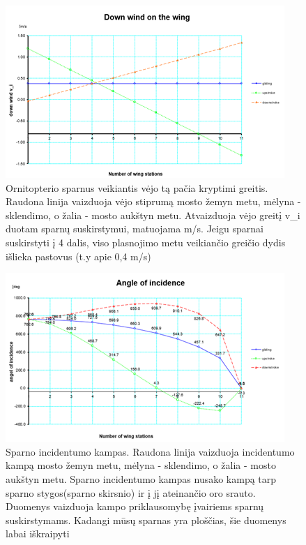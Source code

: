 \documentclass{VUMIFPSkursinis}
\begin{document}
\begin{figure}[h]
	\caption{Ornitopterio sparnus veikiantis vėjo tą pačia kryptimi greitis. Raudona linija vaizduoja vėjo stiprumą mosto žemyn metu, mėlyna - sklendimo, o žalia - mosto aukštyn metu. Atvaizduoja vėjo greitį v\_i duotam sparnų suskirstymui, matuojama m/s. Jeigu sparnai suskirstyti į 4 dalis, viso plasnojimo metu veikiančio greičio dydis išlieka pastovus (t.y apie 0,4 m/s)}
	\centering
	\includegraphics{img/downwind} 
\end{figure}

\begin{figure}[h]
	\caption{Sparno incidentumo kampas. Raudona linija vaizduoja incidentumo kampą mosto žemyn metu, mėlyna - sklendimo, o žalia - mosto aukštyn metu. Sparno incidentumo kampas nusako kampą tarp sparno stygos(sparno skirsnio) ir į jį ateinančio oro srauto. Duomenys vaizduoja kampo priklausomybę įvairiems sparnų suskirstymams. Kadangi mūsų sparnas yra ploščias, šie duomenys labai iškraipyti}
	\includegraphics{img/angle} 
\end{figure}
\end{document}
